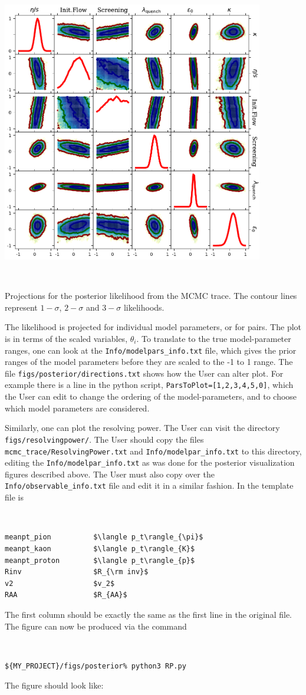 \documentclass[UserManual.tex]{subfiles}
\begin{document}
\parbox{4.5in}{\centerline{\includegraphics[width=4.5in]{posterior_rhic.pdf}}}
~~\parbox{2.0in}{Projections for the posterior likelihood from the MCMC trace. The contour lines represent $1-\sigma$, $2-\sigma$ and $3-\sigma$ likelihoods.}

The likelihood is projected for individual model parameters, or for pairs. The plot is in terms of the scaled variables, $\theta_i$. To translate to the true model-parameter ranges, one can look at the {\tt Info/modelpars\_info.txt} file, which gives the prior ranges of the model parameters before they are scaled to the -1 to 1 range. The file {\tt figs/posterior/directions.txt} shows how the User can alter plot. For example there is a line in the python script, {\tt ParsToPlot=[1,2,3,4,5,0]}, which the User can edit to change the ordering of the model-parameters, and to choose which model parameters are considered.

Similarly, one can plot the resolving power. The User can visit the directory {\tt figs/resolvingpower/}. The User should copy the files {\tt mcmc\_trace/ResolvingPower.txt} and {\tt Info/modelpar\_info.txt} to this directory, editing the {\tt Info/modelpar\_info.txt} as was done for the posterior visualization figures described above. The User must also copy over the {\tt Info/observable\_info.txt} file and edit it in a similar fashion. In the template file is
{\tt
\begin{verbatim}
meanpt_pion          $\langle p_t\rangle_{\pi}$
meanpt_kaon          $\langle p_t\rangle_{K}$
meanpt_proton        $\langle p_t\rangle_{p}$
Rinv                 $R_{\rm inv}$
v2                   $v_2$
RAA                  $R_{AA}$
\end{verbatim}}
The first column should be exactly the same as the first line in the original file. The figure can now be produced via the command
{\tt
\begin{verbatim}
${MY_PROJECT}/figs/posterior% python3 RP.py
\end{verbatim}}
The figure should look like:
\end{document}
